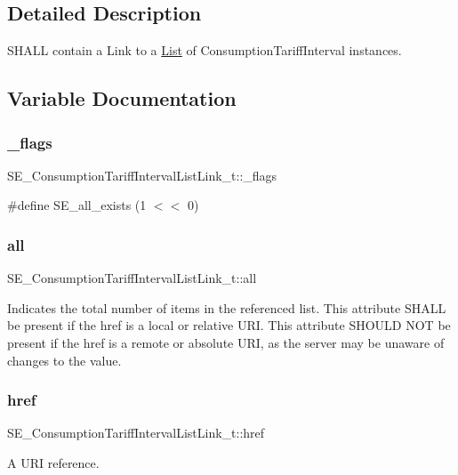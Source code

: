 \subsection{Detailed Description}
S\+H\+A\+LL contain a Link to a \hyperlink{structList}{List} of Consumption\+Tariff\+Interval instances. 

\subsection{Variable Documentation}
\mbox{\label{group__ConsumptionTariffIntervalListLink_ga5734f32544a524977e599b280236b463}} 
\subsubsection{\texorpdfstring{\+\_\+flags}{\_flags}}
{\footnotesize\ttfamily S\+E\+\_\+\+Consumption\+Tariff\+Interval\+List\+Link\+\_\+t\+::\+\_\+flags}

\#define S\+E\+\_\+all\+\_\+exists (1 $<$$<$ 0) \mbox{\label{group__ConsumptionTariffIntervalListLink_gad26eb31b13f0a99cb6ef67fa7adfc193}} 
\subsubsection{\texorpdfstring{all}{all}}
{\footnotesize\ttfamily S\+E\+\_\+\+Consumption\+Tariff\+Interval\+List\+Link\+\_\+t\+::all}

Indicates the total number of items in the referenced list. This attribute S\+H\+A\+LL be present if the href is a local or relative U\+RI. This attribute S\+H\+O\+U\+LD N\+OT be present if the href is a remote or absolute U\+RI, as the server may be unaware of changes to the value. \mbox{\label{group__ConsumptionTariffIntervalListLink_ga2f84900778e99a83f0c8294ce3853f9b}} 
\subsubsection{\texorpdfstring{href}{href}}
{\footnotesize\ttfamily S\+E\+\_\+\+Consumption\+Tariff\+Interval\+List\+Link\+\_\+t\+::href}

A U\+RI reference. 